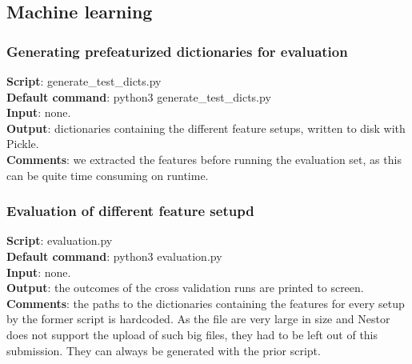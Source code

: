 \documentclass[
10pt, %
a4paper, %
oneside, %
headinclude,footinclude, %
] {book}%
\begin{document}
\subsection{\textbf{Machine learning}}
\subsubsection{Generating prefeaturized dictionaries for evaluation}
\textbf{Script}:	generate\_test\_dicts.py \\
\textbf{Default command}: python3 generate\_test\_dicts.py \\
\textbf{Input}:  none.  \\
\textbf{Output}:  dictionaries containing the different feature setups, written to disk with Pickle. \\
\textbf{Comments}: we extracted the features before running the evaluation set, as this can be quite time consuming on runtime.

\subsubsection{Evaluation of different feature setupd}
\textbf{Script}:	evaluation.py \\
\textbf{Default command}: python3 evaluation.py \\
\textbf{Input}:  none.  \\
\textbf{Output}: the outcomes of the cross validation runs are printed to screen. \\
\textbf{Comments}: the paths to the dictionaries containing the features for every setup by the former script is hardcoded. As the file are very large in size and Nestor does not support the upload of such big files, they had to be left out of this submission. They can always be generated with the prior script. 
\end{document}
